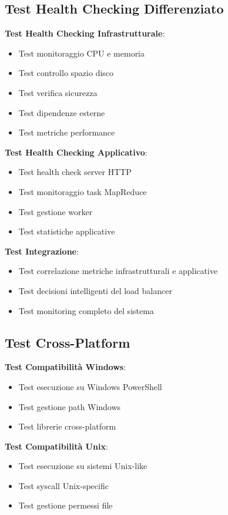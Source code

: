 \documentclass[12pt,a4paper]{article}
\begin{document}
\subsection{Test Health Checking Differenziato}

\textbf{Test Health Checking Infrastrutturale}:
\begin{itemize}
\item Test monitoraggio CPU e memoria
\item Test controllo spazio disco
\item Test verifica sicurezza
\item Test dipendenze esterne
\item Test metriche performance
\end{itemize}

\textbf{Test Health Checking Applicativo}:
\begin{itemize}
\item Test health check server HTTP
\item Test monitoraggio task MapReduce
\item Test gestione worker
\item Test statistiche applicative
\end{itemize}

\textbf{Test Integrazione}:
\begin{itemize}
\item Test correlazione metriche infrastrutturali e applicative
\item Test decisioni intelligenti del load balancer
\item Test monitoring completo del sistema
\end{itemize}

\subsection{Test Cross-Platform}

\textbf{Test Compatibilità Windows}:
\begin{itemize}
\item Test esecuzione su Windows PowerShell
\item Test gestione path Windows
\item Test librerie cross-platform
\end{itemize}

\textbf{Test Compatibilità Unix}:
\begin{itemize}
\item Test esecuzione su sistemi Unix-like
\item Test syscall Unix-specific
\item Test gestione permessi file
\end{itemize}
\end{document}
